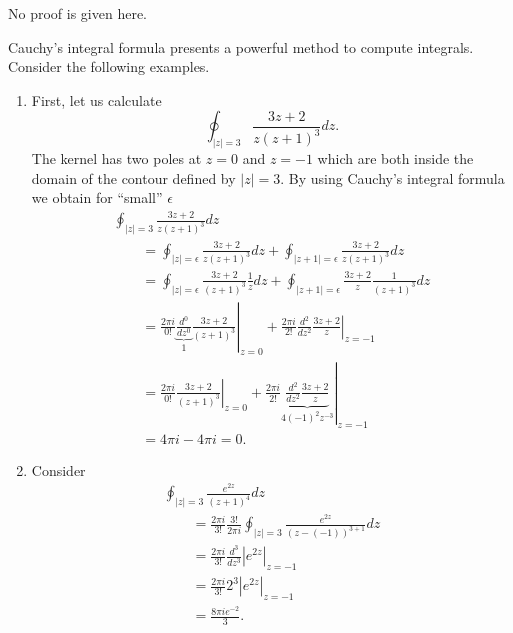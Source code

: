 No proof is given here.


{
\color{blue}
\bexample
Cauchy's integral formula presents a powerful method to compute integrals.
Consider the following examples.

\begin{enumerate}

\item First,
let us calculate  $$\oint_{\vert z\vert =3} \frac{3z+2}{z(z+1)^3} dz.$$
The kernel has two poles at $z=0$ and $z=-1$ which are both inside the domain of the contour defined by $\vert z\vert =3$.
By using Cauchy's integral formula we obtain for ``small'' $\epsilon$
\begin{equation}
\begin{split}
\oint_{\vert z\vert =3} \frac{3z+2}{z(z+1)^3} dz  \\
\qquad =\oint_{\vert z\vert =\epsilon} \frac{3z+2}{z(z+1)^3} dz    + \oint_{\vert z+1\vert =\epsilon} \frac{3z+2}{z(z+1)^3} dz \\
\qquad =\oint_{\vert z\vert =\epsilon} \frac{3z+2}{(z+1)^3} \frac{1}{z} dz    + \oint_{\vert z+1\vert =\epsilon} \frac{3z+2}{z}\frac{1}{(z+1)^3} dz  \\
\qquad =
\left.
\frac{2\pi i}{0!}
\underbrace{\frac{d^0}{dz^0}}_{1}
\frac{3z+2}{(z+1)^3}
\right|_{z=0}
+
\left.
\frac{2\pi i}{2!}
\frac{d^2}{dz^2}
\frac{3z+2}{z}
\right|_{z=-1} \\
\qquad =
\left.
\frac{2\pi i}{0!}
\frac{3z+2}{(z+1)^3}
\right|_{z=0}
+
\left.
\frac{2\pi i}{2!}
\underbrace{\frac{d^2}{dz^2}
\frac{3z+2}{z}}_{4(-1)^2 z^{-3}}
\right|_{z=-1} \\
\qquad = 4\pi i - 4 \pi i  =0.
\end{split}
\end{equation}

\item
Consider
\begin{equation}
\begin{split}
\oint_{\vert z\vert =3}
\frac{e^{2z}}{(z+1)^4 }dz\\
\qquad =
\frac{2\pi i}{3!}
\frac{3!}{2\pi i}
\oint_{\vert z\vert =3}
\frac{e^{2z}}{(z- (-1))^{3+1} }dz  \\
\qquad =
\frac{2\pi i}{3!}
\frac{d^3}{dz^3}
\left| e^{2z} \right|_{z=-1}  \\
\qquad =
\frac{2\pi i}{3!}
2^3  \left| e^{2z} \right|_{z=-1}    \\
\qquad =
\frac{8 \pi i e^{-2}}{3}.
\end{split}
\end{equation}

\end{enumerate}
\eexample
}


